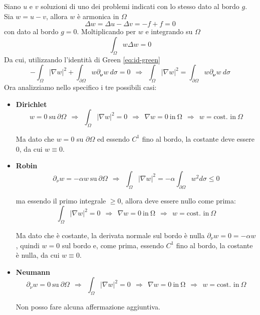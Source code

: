 \documentclass[10pt,a4paper,twoside,openright]{book}
\begin{document}
\begin{dimostrazione}
	Siano $u$ e $v$ soluzioni di uno dei problemi indicati con lo stesso dato al bordo $g$. Sia $w=u-v$, allora $w$ è armonica in $\Omega $
	\begin{equation*}
		\Delta w=\Delta u-\Delta v=-f+f=0
	\end{equation*}
	con dato al bordo $g=0$. Moltiplicando per $w$ e integrando su $\Omega $
	\begin{equation*}
		\int _{\Omega } w\Delta w=0
	\end{equation*}
	Da cui, utilizzando l'identità di Green \eqref{eq:id-green}
	\begin{equation*}
		-\int _{\Omega }| \nabla w| ^{2} +\int _{\partial \Omega } w\partial _{\bm{\nu}} w\ d\sigma =0\ \ \Rightarrow \ \ \int _{\Omega }| \nabla w| ^{2} =\int _{\partial \Omega } w\partial _{\bm{\nu}} w\ d\sigma 
	\end{equation*}
	Ora analizziamo nello specifico i tre possibili casi:
	\begin{itemize}
		\item \textbf{Dirichlet}\begin{equation*}
		w=0\ \text{su} \ \partial \Omega \ \ \Rightarrow \ \ \int _{\Omega }| \nabla w| ^{2} =0\ \ \Rightarrow \ \ \nabla w=0\ \text{in} \ \mathrm{\Omega } \ \ \Rightarrow \ \ w=\text{cost. in} \ \Omega 
		\end{equation*}

		Ma dato che $\displaystyle w=0$ su $\displaystyle \partial \Omega $ ed essendo $\displaystyle C^{1}$ fino al bordo, la costante deve essere $\displaystyle 0$, da cui $\displaystyle w\equiv 0$.
		\item \textbf{Robin}\begin{equation*}
		\partial _{\nu } w=-\alpha w\ \text{su} \ \partial \Omega \ \ \Rightarrow \ \ \int _{\Omega }| \nabla w| ^{2} =-\alpha \int _{\partial \Omega } w^{2} d\sigma \leqslant 0
		\end{equation*}

		ma essendo il primo integrale $\displaystyle \geqslant 0$, allora deve essere nullo come prima:\begin{equation*}
		\int _{\Omega }| \nabla w| ^{2} =0\ \ \Rightarrow \ \ \nabla w=0\ \text{in} \ \mathrm{\Omega } \ \ \Rightarrow \ \ w=\text{cost. in} \ \Omega 
		\end{equation*}

		Ma dato che è costante, la derivata normale sul bordo è nulla $\displaystyle \partial _{\nu } w=0=-\alpha w$, quindi $\displaystyle w=0$ sul bordo e, come prima, essendo $\displaystyle C^{1}$ fino al bordo, la costante è nulla, da cui $\displaystyle w\equiv 0$.
		\item \textbf{Neumann}\begin{equation*}
		\partial _{\nu } w=0\ \text{su} \ \partial \Omega \ \ \Rightarrow \ \ \int _{\Omega }| \nabla w| ^{2} =0\ \ \Rightarrow \ \ \nabla w=0\ \text{in} \ \mathrm{\Omega } \ \ \Rightarrow \ \ w=\text{cost. in} \ \Omega 
		\end{equation*}

		Non posso fare alcuna affermazione aggiuntiva.
	\end{itemize}
\end{dimostrazione}
\end{document}
